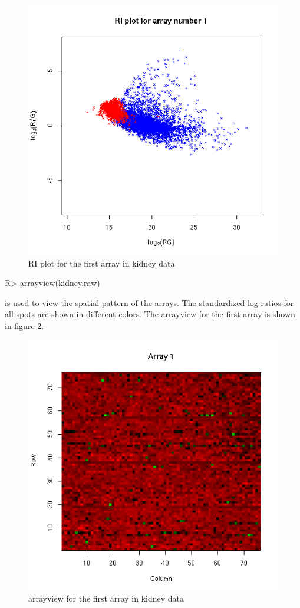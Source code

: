 \begin{enumerate}
\begin{figure}[htbp]
\includegraphics{riplot.png}
\caption{RI plot for the first array in kidney data}
\label{fig:riplot}
\end{figure}
\begin{Sinput}
R> arrayview(kidney.raw)
\end{Sinput}
 is used to view the spatial pattern of the arrays.
The standardized log ratios for all spots are shown in different colors.
The arrayview for the first array is shown in figure \ref{fig:arrayview}.
\begin{figure}[htbp]
\centering
\includegraphics{arrayview.png}
\caption{arrayview for the first array in kidney data}
\label{fig:arrayview}
\end{figure}


\end{enumerate}
